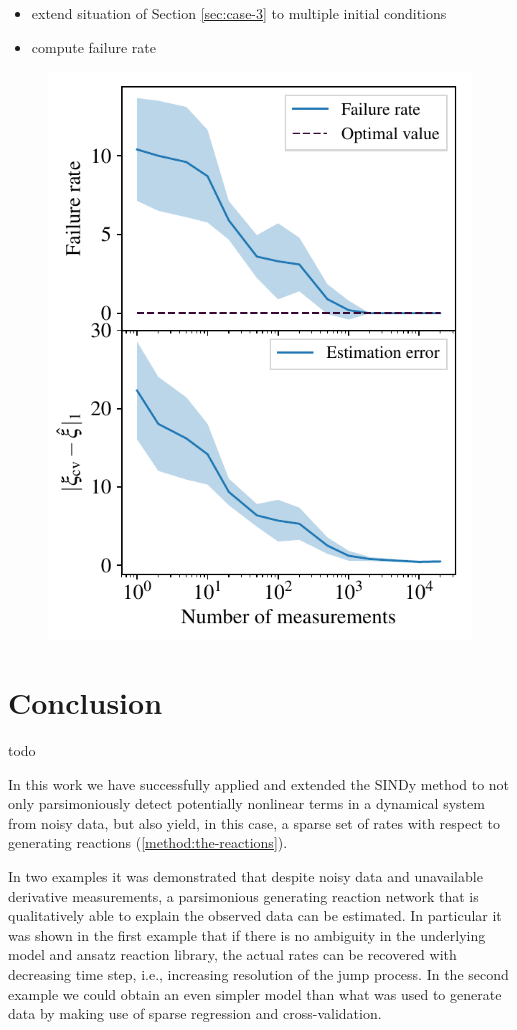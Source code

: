 \documentclass[oneside, abstracton, titlepage]{scrartcl}
\newenvironment{colbox}[1]
{\newcommand\colboxcolor{#1}%
	\begin{lrbox}{\selvestebox}%
		\begin{minipage}{\dimexpr\columnwidth-2\fboxsep\relax}}
		{\end{minipage}\end{lrbox}%
	\begin{center}
		\colorbox[HTML]{\colboxcolor}{\usebox{\selvestebox}}
\end{center}}
\begin{document}
	\begin{itemize}
		\item extend situation of Section \ref{sec:case-3} to multiple initial conditions
		\item compute failure rate
	\end{itemize}

	\begin{figure}
		\centering
		\includegraphics[width=.5\columnwidth]{./figures_tex/case3}
	\end{figure}
    
	\section{Conclusion}
	\begin{colbox}{F8E0E0}
		todo
	\end{colbox}
	In this work we have successfully applied and extended the SINDy method to not only parsimoniously detect potentially nonlinear terms in a dynamical system from noisy data, but also yield, in this case, a sparse set of rates with respect to generating reactions (\ref{method:the-reactions}).

	In two examples it was demonstrated that despite noisy data and unavailable derivative measurements, a parsimonious generating reaction network that is qualitatively able to explain the observed data can be estimated.
	In particular it was shown in the first example that if there is no ambiguity in the underlying model and ansatz reaction library, the actual rates can be recovered with decreasing time step, i.e., increasing resolution of the jump process.
	In the second example we could obtain an even simpler model than what was used to generate data by making use of sparse regression and cross-validation.
\end{document}
